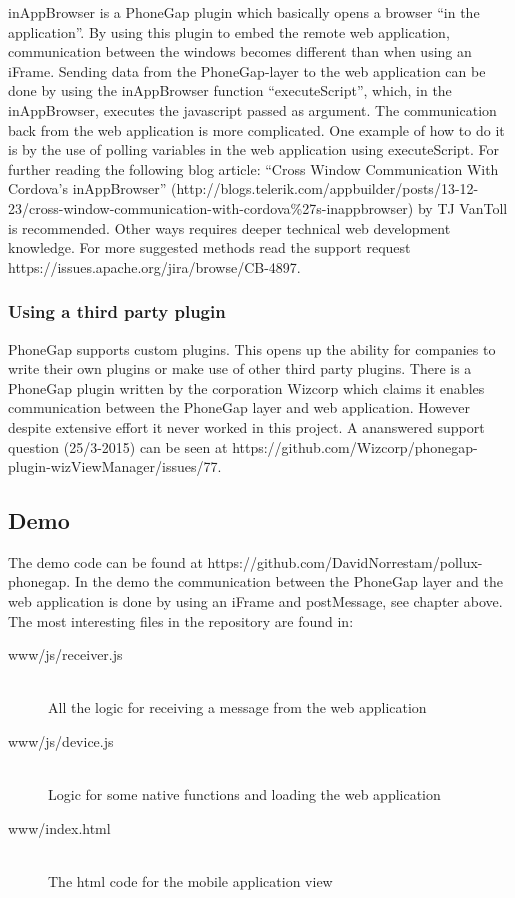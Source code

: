 inAppBrowser is a PhoneGap plugin which basically opens a browser “in the application”. By using this plugin to embed the remote web application, communication between the windows becomes different than when using an iFrame. Sending data from the PhoneGap-layer to the web application can be done by using the inAppBrowser function “executeScript”, which, in the inAppBrowser, executes the javascript passed as argument.
The communication back from the web application is more complicated. One example of how to do it is by the use of polling variables in the web application using executeScript. For further reading the following blog article: “Cross Window Communication With Cordova’s inAppBrowser” (http://blogs.telerik.com/appbuilder/posts/13-12-23/cross-window-communication-with-cordova\%27s-inappbrowser) by TJ VanToll is recommended. 
\newline\newline
Other ways requires deeper technical web development knowledge. For more suggested methods read the support request https://issues.apache.org/jira/browse/CB-4897.

\subsubsection{Using a third party plugin}
PhoneGap supports custom plugins. This opens up the ability for companies to write their own plugins or make use of other third party plugins.
\newline\newline
There is a PhoneGap plugin written by the corporation Wizcorp which claims it enables communication between the PhoneGap layer and web application. However despite extensive effort it never worked in this project. A ananswered support question (25/3-2015) can be seen at https://github.com/Wizcorp/phonegap-plugin-wizViewManager/issues/77. 

\subsection{Demo}
The demo code can be found at https://github.com/DavidNorrestam/pollux-phonegap. In the demo the communication between the PhoneGap layer and the web application is done by using an iFrame and postMessage, see chapter above. The most interesting files in the repository are found in:

\begin{description}
  \item[www/js/receiver.js] \hfill \\
    All the logic for receiving a message from the web application
  \item[www/js/device.js] \hfill \\
    Logic for some native functions and loading the web application
  \item[www/index.html] \hfill \\
    The html code for the mobile application view
\end{description}